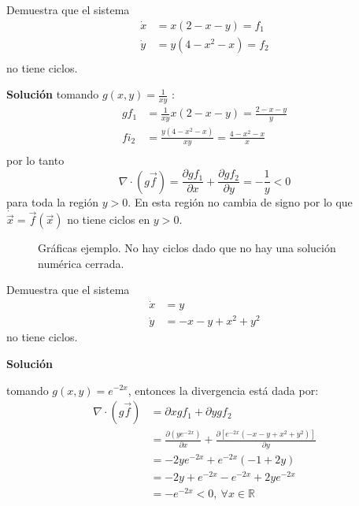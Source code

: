 \begin{ejemplo} \label{cicloseje1} Demuestra que el sistema
  \begin{align*}
    \dot{x} &= x \left( 2-x-y \right) =f_1 \\ 
    \dot{y} &= y(4-x^2-x)=f_2 \\ 
  \end{align*}
  no tiene ciclos.
  \begin{tcolorbox}[colback=Black!4, colframe=White, arc = 2mm]
  \textbf{Solución}
  tomando $g(x,y)=\frac{1}{xy}$ :
  \begin{align*}
    gf_1 &= \frac{1}{xy}x \left( 2-x-y \right)  = \frac{2-x-y}{y} \\
    fi_2 &= \frac{y(4-x^2-x)}{xy} = \frac{4-x^2-x}{x} \\ 
  \end{align*}
  por lo tanto 
  $$
  \nabla \cdot (g \vec{f}) = \frac{\partial gf_1}{\partial x} + \frac{\partial gf_2}{\partial y}  = -\frac{1}{y} < 0
  $$
  para toda la región $y>0$. En esta región no cambia de signo por lo que $\dot{\vec{x}}=\vec{f}(\vec{x})$ no tiene ciclos en $y>0$.
  \end{tcolorbox} 
  \begin{figure}[H]
   \centering
    \vfill
      \caption{Gráficas ejemplo. No hay ciclos dado que no hay una solución numérica cerrada.}
  \end{figure}
\end{ejemplo}
\begin{ejemplo} \label{ciclos2eje2} Demuestra que el sistema
  \begin{align*}
    \dot{x} &= y \\ 
    \dot{y} &=  -x-y+x^2+y^2 
  \end{align*}
  no tiene ciclos.
  \begin{tcolorbox}[colback=Black!4, colframe=White, arc = 2mm]
  \textbf{Solución}
 
  tomando $g(x,y)= e^{-2x}$, entonces la divergencia está dada por: 
  $$
  \begin{aligned}
    \nabla \cdot (g \vec{f}) &= \partial x gf_1 + \partial y gf_2 \\ &= \frac{\partial (ye^{-2x})}{\partial x} + \frac{\partial \left[ e^{-2x}(-x-y+x^2+y^2) \right] }{\partial y}  \\ 
    &= -2ye^{-2x}+e^{-2x}(-1+2y) \\
    &= -2y+e^{-2x}-e^{-2x}+2ye^{-2x}  \\
    &= -e^{-2x} <0 ,\ \forall x \in \mathbb{R}  \\ 
  \end{aligned}
  $$         
  \end{tcolorbox} 
\end{ejemplo}

